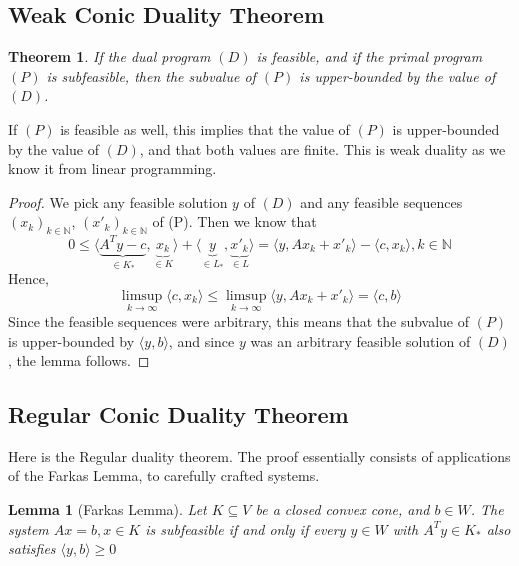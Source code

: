 \documentclass[12pt]{article}
\newtheorem*{theorem}{Theorem}
\newtheorem*{lemma}{Lemma}
\begin{document}
    \subsection{Weak Conic Duality Theorem}
    \begin{theorem}
    If the dual program $(D)$ is feasible, and if the primal program
$(P)$ is subfeasible, then the subvalue of $(P)$ is upper-bounded by the value of $(D)$.
\end{theorem}
If $(P)$ is feasible as well, this implies that the value of $(P)$ is upper-bounded by the value of $(D)$, and that both values are finite. This is weak duality as we know it from linear programming.
\begin{proof}
     We pick any feasible solution $y$ of $(D)$ and any feasible sequences $(x_k)_{k \in \mathbb{N}}$, $(x'_k)_{k \in \mathbb{N}}$ of (P). Then we know that
     $$ 0 \leq \langle \underbrace{A^T y - c}_{\in  K_*}, \underbrace{x_k}_{\in K} \rangle + \langle \underbrace{y}_{\in L_*}, \underbrace{x'_k}_{\in L} \rangle = \langle y, Ax_k + x'_k \rangle - \langle c, x_k \rangle, k \in \mathbb{N} $$
     Hence, 
     $$\limsup_{k\rightarrow \infty}{\langle c, x_k \rangle} \leq \limsup_{k\rightarrow \infty}{\langle y, Ax_k + x'_k \rangle} = \langle c, b \rangle $$
     Since the feasible sequences were arbitrary, this means that the subvalue of $(P)$ is upper-bounded by $\langle y, b \rangle$, and since $y$ was an arbitrary feasible solution of $(D)$, the lemma follows.
     
\end{proof}
    \subsection{Regular Conic Duality Theorem}
    Here is the Regular duality theorem. The proof essentially consists of applications of the Farkas Lemma, to carefully crafted systems. \\
    \begin{lemma}
    [Farkas Lemma] Let $K \subseteq V$ be a closed convex cone, and $b \in W$. The system $Ax = b, x \in K$ is subfeasible if and only if every $y \in W$ with $A^Ty \in K_*$ also satisfies $\langle y, b \rangle \geq 0$
    \end{lemma}
    
\end{document}
